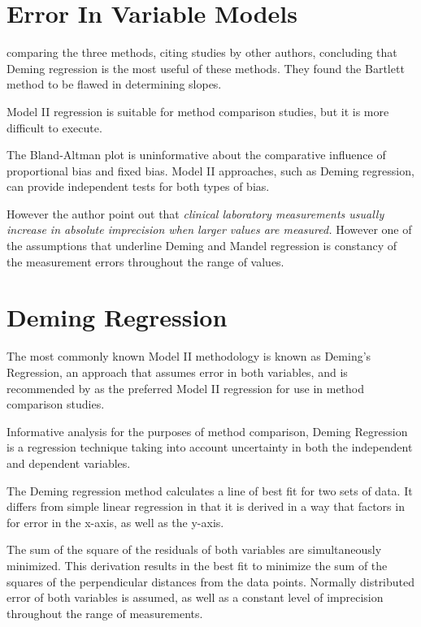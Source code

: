 \documentclass[12pt, a4paper]{report}
\theoremstyle{plain}
\theoremstyle{definition}
\theoremstyle{remark}
\begin{document}
	


\section{Error In Variable Models}

	
\citet{CornCoch} comparing the three methods, citing studies by other authors, concluding that Deming regression is the most useful of these methods. They found the Bartlett method to be flawed in determining slopes.
	
Model II regression is suitable for method comparison studies, but it is more difficult to execute. 

The Bland-Altman plot is uninformative about the comparative influence of proportional bias and fixed bias. Model II approaches, such as Deming regression, can provide independent tests for both types of bias.
		
However the author point out that \emph{ clinical laboratory measurements usually increase in absolute imprecision when larger values are measured.} However one of the assumptions that underline Deming and Mandel regression is constancy of the measurement errors throughout the range of values.
	
	
\section{Deming Regression}
The most commonly known Model II methodology is known as Deming's Regression, an approach that assumes error in both variables, and is recommended by \citet*{CornCoch} as the preferred Model II regression for use in method comparison studies. 
		
Informative analysis for the purposes of method comparison, Deming Regression is a regression technique taking into account uncertainty in both the independent and dependent variables.
	
The Deming regression method calculates a line of best fit for two sets of data. It differs from simple linear regression in that it is derived in a way that factors in for error in the x-axis, as well as the y-axis. 

The sum of the square of the residuals of both variables are simultaneously minimized. This derivation results in the best fit to minimize the sum of the squares of the perpendicular distances from the data points. Normally distributed error of both variables is assumed, as well as a constant level of imprecision throughout the range of measurements.
\end{document}
